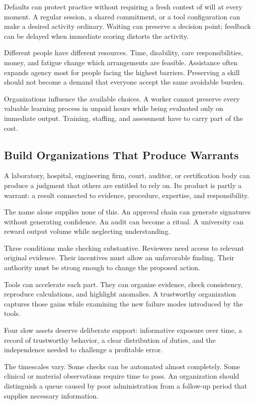 \documentclass[11pt,openany]{book}
\begin{document}
Defaults can protect practice without requiring a fresh contest of will at every moment. A regular session, a shared commitment, or a tool configuration can make a desired activity ordinary. Waiting can preserve a decision point; feedback can be delayed when immediate scoring distorts the activity.

Different people have different resources. Time, disability, care responsibilities, money, and fatigue change which arrangements are feasible. Assistance often expands agency most for people facing the highest barriers. Preserving a skill should not become a demand that everyone accept the same avoidable burden.

Organizations influence the available choices. A worker cannot preserve every valuable learning process in unpaid hours while being evaluated only on immediate output. Training, staffing, and assessment have to carry part of the cost.

\subsection{Build Organizations That Produce Warrants}

A laboratory, hospital, engineering firm, court, auditor, or certification body can produce a judgment that others are entitled to rely on. Its product is partly a warrant: a result connected to evidence, procedure, expertise, and responsibility.

The name alone supplies none of this. An approval chain can generate signatures without generating confidence. An audit can become a ritual. A university can reward output volume while neglecting understanding.

Three conditions make checking substantive. Reviewers need access to relevant original evidence. Their incentives must allow an unfavorable finding. Their authority must be strong enough to change the proposed action.

Tools can accelerate each part. They can organize evidence, check consistency, reproduce calculations, and highlight anomalies. A trustworthy organization captures those gains while examining the new failure modes introduced by the tools.

Four slow assets deserve deliberate support: informative exposure over time, a record of trustworthy behavior, a clear distribution of duties, and the independence needed to challenge a profitable error.

The timescales vary. Some checks can be automated almost completely. Some clinical or material observations require time to pass. An organization should distinguish a queue caused by poor administration from a follow-up period that supplies necessary information.
\end{document}
